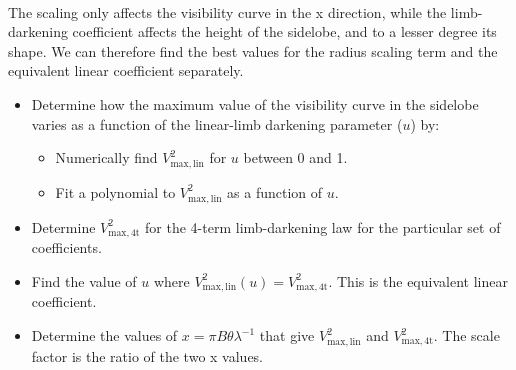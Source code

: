 \documentclass[11pt]{article}
\providecommand{\tightlist}{%
      \setlength{\itemsep}{0pt}\setlength{\parskip}{0pt}}
\begin{document}
    \begin{center}
    \end{center}
    { \hspace*{\fill} \\}
    
    The scaling only affects the visibility curve in the x direction, while
the limb-darkening coefficient affects the height of the sidelobe, and
to a lesser degree its shape. We can therefore find the best values for
the radius scaling term and the equivalent linear coefficient
separately.

\begin{itemize}
\tightlist
\item
  Determine how the maximum value of the visibility curve in the
  sidelobe varies as a function of the linear-limb darkening parameter
  (\(u\)) by:

  \begin{itemize}
  \tightlist
  \item
    Numerically find \(V^2_\mathrm{max, lin}\) for \(u\) between 0 and
    1.
  \item
    Fit a polynomial to \(V^2_\mathrm{max, lin}\) as a function of
    \(u\).
  \end{itemize}
\item
  Determine \(V^2_\mathrm{max, 4t}\) for the 4-term limb-darkening law
  for the particular set of coefficients.
\item
  Find the value of \(u\) where
  \(V^2_\mathrm{max, lin}(u) = V^2_\mathrm{max, 4t}\). This is the
  equivalent linear coefficient.
\item
  Determine the values of \(x = \pi B \theta \lambda^{-1}\) that give
  \(V^2_\mathrm{max, lin}\) and \(V^2_\mathrm{max, 4t}\). The scale
  factor is the ratio of the two x values.
\end{itemize}
\end{document}

